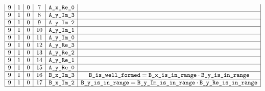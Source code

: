 \begin{figure}[h!]
\begin{adjustwidth}{-2cm}{-2cm}
\[\begin{array}{|c|c|c|c|c|c|c|}
                9 & 1      & 0      & 7           & \texttt{A\_x\_Re\_0}              &                                                                                                                               \\ \hline
                9 & 1      & 0      & 8           & \texttt{A\_y\_Im\_3}             &                                                                                                                               \\ \hline
                9 & 1      & 0      & 9           & \texttt{A\_y\_Im\_2}               &                                                                                                                               \\ \hline
                9 & 1      & 0      & 10          & \texttt{A\_y\_Im\_1}               &                                                                                                                               \\ \hline
                9 & 1      & 0      & 11          & \texttt{A\_y\_Im\_0}              &                                                                                                                               \\ \hline
                9 & 1      & 0      & 12          & \texttt{A\_y\_Re\_3}             &                                                                                                                               \\ \hline
                9 & 1      & 0      & 13          & \texttt{A\_y\_Re\_2}               &                                                                                                                               \\ \hline
                9 & 1      & 0      & 14          & \texttt{A\_y\_Re\_1}               &                                                                                                                               \\ \hline
                9 & 1      & 0      & 15          & \texttt{A\_y\_Re\_0}              &                                                                                                                               \\ \hline
                9 & 1      & 0      & 16          & \texttt{B\_x\_Im\_3}             & \texttt{B\_is\_well\_formed} = \texttt{B}\texttt{\_x}\texttt{\_is\_in\_range}   \cdot \texttt{B}\texttt{\_y}\texttt{\_is\_in\_range}                                                                   \\ \hline
                9 & 1      & 0      & 17          & \texttt{B\_x\_Im\_2}               & \texttt{B}\texttt{\_y}\texttt{\_is\_in\_range} =   \texttt{B}\texttt{\_y}\texttt{\_Im}\texttt{\_is\_in\_range} \cdot \texttt{B}\texttt{\_y}\texttt{\_Re}\texttt{\_is\_in\_range}                                                                 \\ \hline

\end{array}\]
\end{adjustwidth}
\end{figure}
